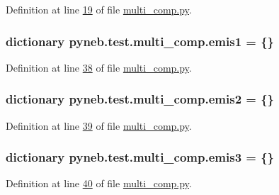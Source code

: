 Definition at line \hyperlink{multi__comp_8py_source_l00019}{19} of file \hyperlink{multi__comp_8py_source}{multi\-\_\-comp.\-py}.

\hypertarget{namespacepyneb_1_1test_1_1multi__comp_aebd32d235cbe50309883179020a725cc}{
\subsubsection[{emis1}]{\setlength{\rightskip}{0pt plus 5cm}dictionary pyneb.\-test.\-multi\-\_\-comp.\-emis1 = \{\}}}\label{namespacepyneb_1_1test_1_1multi__comp_aebd32d235cbe50309883179020a725cc}


Definition at line \hyperlink{multi__comp_8py_source_l00038}{38} of file \hyperlink{multi__comp_8py_source}{multi\-\_\-comp.\-py}.

\hypertarget{namespacepyneb_1_1test_1_1multi__comp_a1a175a8aaa7357bc4f694ee7d9105e56}{
\subsubsection[{emis2}]{\setlength{\rightskip}{0pt plus 5cm}dictionary pyneb.\-test.\-multi\-\_\-comp.\-emis2 = \{\}}}\label{namespacepyneb_1_1test_1_1multi__comp_a1a175a8aaa7357bc4f694ee7d9105e56}


Definition at line \hyperlink{multi__comp_8py_source_l00039}{39} of file \hyperlink{multi__comp_8py_source}{multi\-\_\-comp.\-py}.

\hypertarget{namespacepyneb_1_1test_1_1multi__comp_aefc15ba67ef2411cad13adcc08d97d41}{
\subsubsection[{emis3}]{\setlength{\rightskip}{0pt plus 5cm}dictionary pyneb.\-test.\-multi\-\_\-comp.\-emis3 = \{\}}}\label{namespacepyneb_1_1test_1_1multi__comp_aefc15ba67ef2411cad13adcc08d97d41}


Definition at line \hyperlink{multi__comp_8py_source_l00040}{40} of file \hyperlink{multi__comp_8py_source}{multi\-\_\-comp.\-py}.

